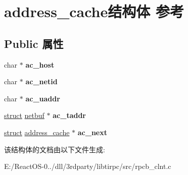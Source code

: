 \hypertarget{structaddress__cache}{}\section{address\+\_\+cache结构体 参考}
\label{structaddress__cache}
\subsection*{Public 属性}
\begin{DoxyCompactItemize}
\item 
\mbox{\label{structaddress__cache_a3e9ab5f3eac27f0c58731c3a0ba85f30}} 
char $\ast$ {\bfseries ac\+\_\+host}
\item 
\mbox{\label{structaddress__cache_a12bf3c21d5aa5aa424f2808d8774d8c0}} 
char $\ast$ {\bfseries ac\+\_\+netid}
\item 
\mbox{\label{structaddress__cache_a896bea777d1ddd98a61b97289595b4b4}} 
char $\ast$ {\bfseries ac\+\_\+uaddr}
\item 
\mbox{\label{structaddress__cache_a2aab24f8d9a5f342cd7a6d47f9d866ff}} 
\hyperlink{interfacestruct}{struct} \hyperlink{structnetbuf}{netbuf} $\ast$ {\bfseries ac\+\_\+taddr}
\item 
\mbox{\label{structaddress__cache_aacec500b9d949b9620783483d6f4f110}} 
\hyperlink{interfacestruct}{struct} \hyperlink{structaddress__cache}{address\+\_\+cache} $\ast$ {\bfseries ac\+\_\+next}
\end{DoxyCompactItemize}


该结构体的文档由以下文件生成\+:\begin{DoxyCompactItemize}
\item 
E\+:/\+React\+O\+S-\/0../dll/3rdparty/libtirpc/src/rpcb\+\_\+clnt.\+c\end{DoxyCompactItemize}
